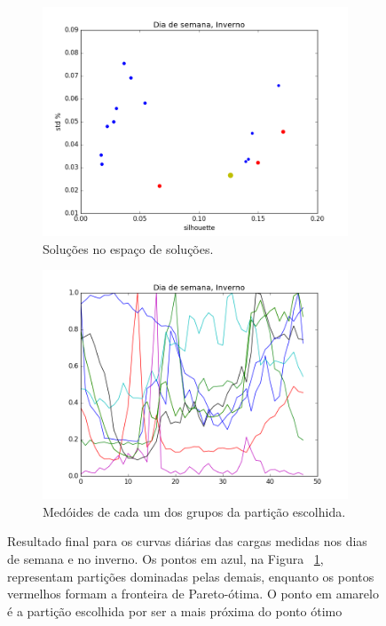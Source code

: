 \begin{figure}[!h]
	\centering
	\begin{subfigure}{.5\textwidth}
		\centering
		\includegraphics[width=.9\linewidth]{figuras/australia_5000/pareto_Dia_de_semana_Inverno.png}
		\caption{Soluções no espaço de soluções.}
		\label{fig:pareto_DDS_inverno}
	\end{subfigure}%
	\begin{subfigure}{.5\textwidth}
		\centering
		\includegraphics[width=.9\linewidth]{figuras/australia_5000/Dia_de_semana_Inverno.png}
		\caption{Medóides de cada um dos grupos da partição escolhida.}
		\label{fig:DDS_inverno}
	\end{subfigure}
	\caption{Resultado final para os curvas diárias das cargas medidas nos dias de semana e no inverno. Os pontos em azul, na Figura ~\ref{fig:pareto_DDS_inverno}, representam partições dominadas pelas demais, enquanto os pontos vermelhos formam a fronteira de Pareto-ótima. O ponto em amarelo é a partição escolhida por ser a mais próxima do ponto ótimo}
	\label{fig:DDS_inverno_}
\end{figure}

